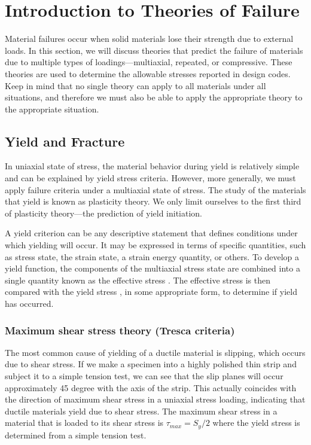 \documentclass[
10pt,
a4paper,
openany,
svgnames,
]{book}
\begin{document}

\chapter{Introduction to Theories of Failure}

Material failures occur when solid materials lose their strength due to external loads. In this section, we will discuss theories that predict the failure of materials due to multiple types of loadings—multiaxial, repeated, or compressive. These theories are used to determine the allowable stresses reported in design codes. Keep in mind that no single theory can apply to all materials under all situations, and therefore we must also be able to apply the appropriate theory to the appropriate situation.

\section{Yield and Fracture}

In uniaxial state of stress, the material behavior during yield is relatively simple and can be explained by yield stress criteria. However, more generally, we must apply failure criteria under a multiaxial state of stress. The study of the materials that yield is known as plasticity theory. We only limit ourselves to the first third of plasticity theory—the prediction of yield initiation.

A yield criterion can be any descriptive statement that defines conditions under which yielding will occur. It may be expressed in terms of specific quantities, such as stress state, the strain state, a strain energy quantity, or others. To develop a yield function, the components of the multiaxial stress state are combined into a single quantity known as the effective stress . The effective stress is then compared with the yield stress , in some appropriate form, to determine if yield has occurred.

\subsection{Maximum shear stress theory (Tresca criteria)}

The most common cause of yielding of a ductile material is slipping, which occurs due to shear stress. If we make a specimen into a highly polished thin strip and subject it to a simple tension test, we can see that the slip planes will occur approximately 45 degree with the axis of the strip. This actually coincides with the direction of maximum shear stress in a uniaxial stress loading, indicating that ductile materials yield due to shear stress. The maximum shear stress in a material that is loaded to its shear stress is $\tau_{max} = S_y / 2$ where the yield stress is determined from a simple tension test.
\end{document}
